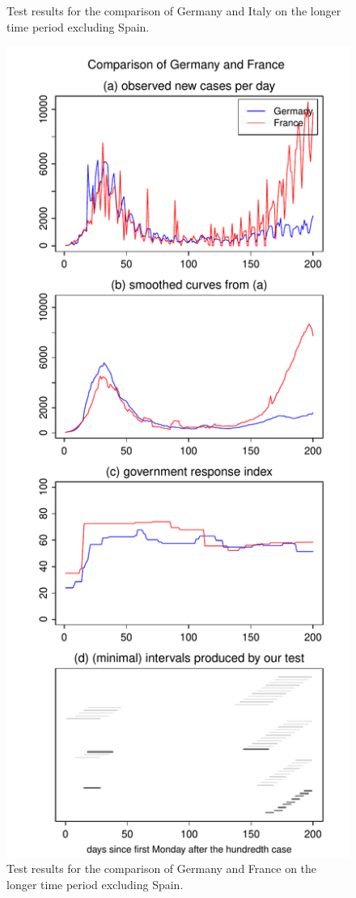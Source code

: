 \documentclass[a4paper,12pt]{article}
\numberwithin{equation}{section}
\begin{document}
{\begin{figure}[h!]
\begin{minipage}[t]{0.49\textwidth}
\caption{Test results for the comparison of Germany and Italy on the longer time period excluding Spain.}\label{fig:supp3:first2}
\end{minipage}
\hspace{0.25cm}
\begin{minipage}[t]{0.49\textwidth}
\includegraphics[width=\textwidth]{plots/DEU_vs_FRA_four_countries}
\caption{Test results for the comparison of Germany and France on the longer time period excluding Spain.}
\end{minipage}
\end{figure}


}
\end{document}
